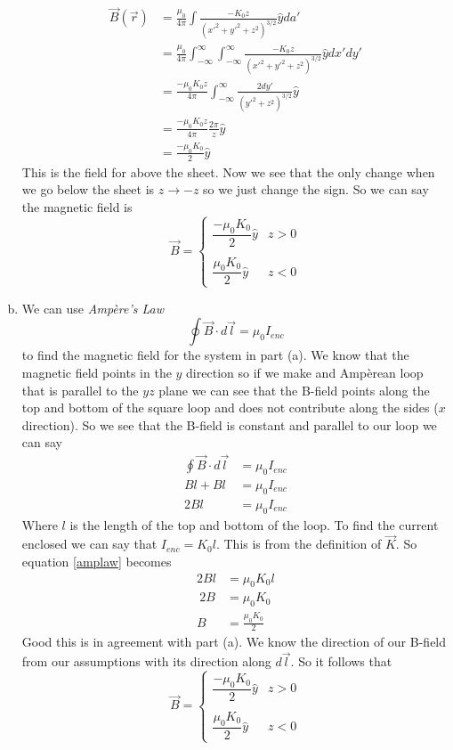 \documentclass[11pt]{article}
\numberwithin{equation}{section}
\begin{document}
\begin{enumerate}[(a)]
\begin{align*}
\vec{B}(\vec{r}) &= \frac{\mu_0}{4\pi}\int\frac{-K_0z}{(x'^2+y'^2+z^2)^{3/2}}\hat{y}da'\\
&= \frac{\mu_0}{4\pi}\int_{-\infty}^{\infty}\int_{-\infty}^{\infty}\frac{-K_0z}{(x'^2+y'^2+z^2)^{3/2}}\hat{y}dx'dy'\\
&= \frac{-\mu_0K_0z}{4\pi}\int_{-\infty}^{\infty}\frac{2dy'}{(y'^2+z^2)^{3/2}}\hat{y}\\
&= \frac{-\mu_0K_0z}{4\pi}\frac{2\pi}{z}\hat{y}\\
&= \frac{-\mu_0K_0}{2}\hat{y}
\end{align*}
This is the field for above the sheet. Now we see that the only change when we go below the sheet is $z\rightarrow-z$ so we just change the sign. So we can say the magnetic field is
$$\vec{B} = \left\{\begin{array}{lc}
	\dfrac{-\mu_0K_0}{2}\hat{y}	&z>0\\
\\
	\dfrac{\mu_0K_0}{2}\hat{y}	&z<0
	\end{array}\right.$$

\item
We can use \emph{Amp\`{e}re's Law} 
\begin{equation}
\oint\vec{B}\cdot d\vec{l} = \mu_0 I_{enc}
\label{amplaw}
\end{equation}
to find the magnetic field for the system in part (a). We know that the magnetic field points in the $y$ direction so if we make and Amp\`{e}rean loop that is parallel to the $yz$ plane we can see that the B-field points along the top and bottom of the square loop and does not contribute along the sides ($x$ direction). So we see that the B-field is constant and parallel to our loop we can say
\begin{align*}
\oint\vec{B}\cdot d\vec{l} &= \mu_0 I_{enc}\\
Bl+Bl &= \mu_0 I_{enc}\\
2Bl &= \mu_0 I_{enc}
\end{align*}
Where $l$ is the length of the top and bottom of the loop. To find the current enclosed we can say that $I_{enc} = K_0l$. This is from the definition of $\vec{K}$. So equation \ref{amplaw} becomes 
\begin{align*}
2Bl &= \mu_0K_0l\\\
2B &= \mu_0K_0\\
B &= \frac{\mu_0K_0}{2}
\end{align*}
Good this is in agreement with part (a). We know the direction of our B-field from our assumptions with its direction along $d\vec{l}$. So it follows that
$$\vec{B} = \left\{\begin{array}{lc}
	\dfrac{-\mu_0K_0}{2}\hat{y}	&z>0\\
\\
	\dfrac{\mu_0K_0}{2}\hat{y}	&z<0
	\end{array}\right.$$


\end{enumerate}
\end{document}
